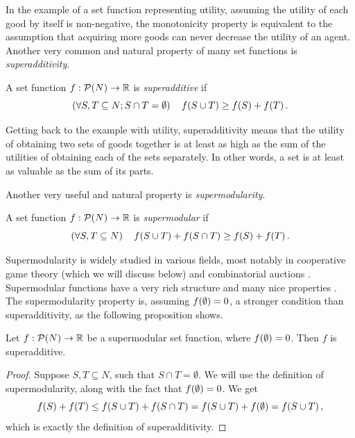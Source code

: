 In the example of a set function representing utility, assuming the utility of each good by itself is non-negative, the monotonicity property is equivalent to the assumption that acquiring more goods can never decrease the utility of an agent.
Another very common and natural property of many set functions is \emph{superadditivity}.

\begin{defi}[Superadditivity]
	A set function $ f: \mathcal{P}\!\left(N\right) \to \mathbb{R} $ is \emph{superadditive} if \[
		\left( \forall S, T \subseteq N; S \cap T = \emptyset \right)\quad f\!\left(S \cup T\right) \geq f\!\left(S\right) + f\!\left(T\right).
	\]
\end{defi}

Getting back to the example with utility, superadditivity means that the utility of obtaining two sets of goods together is at least as high as the sum of the utilities of obtaining each of the sets separately.
In other words, a set is at least as valuable as the sum of its parts.

Another very useful and natural property is \emph{supermodularity}.

\begin{defi}[Supermodularity]
	A set function $ f: \mathcal{P}\!\left(N\right) \to \mathbb{R} $ is \emph{supermodular} if \[
		\left( \forall S, T \subseteq N \right)\quad f\!\left(S \cup T\right) + f\!\left(S \cap T\right) \geq f\!\left(S\right) + f\!\left(T\right).
	\]
\end{defi}

Supermodularity is widely studied in various fields, most notably in cooperative game theory (which we will discuss below) and combinatorial auctions \citep{grabisch2016set,doi:10.1287/ijoc.15.3.284.16077}.
Supermodular functions have a very rich structure and many nice properties \citep{Lovasz1983}.
The supermodularity property is, assuming $ f\!\left(\emptyset\right) = 0 $, a stronger condition than superadditivity, as the following proposition shows.

\begin{prop}[ ]
	Let $ f: \mathcal{P}\!\left(N\right) \to \mathbb{R} $ be a supermodular set function, where $ f\!\left(\emptyset\right) = 0 $.
	Then $ f $ is superadditive.
\end{prop}

\begin{proof}
	Suppose $ S,T \subseteq N $, such that $ S \cap T = \emptyset $.
	We will use the definition of supermodularity, along with the fact that $ f\!\left(\emptyset\right) = 0 $.
	We get \[
		f\!\left(S\right) + f\!\left(T\right) \leq f\!\left(S \cup T\right) + f\!\left(S \cap T\right) = f\!\left(S \cup T\right) + f\!\left(\emptyset\right) = f\!\left(S \cup T\right),
	\]
	which is exactly the definition of superadditivity.
\end{proof}

